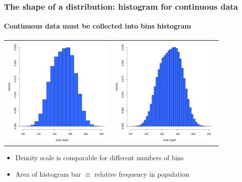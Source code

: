 \documentclass[t]{beamer} %
\begin{document}
\begin{frame}
  \frametitle{The shape of a distribution: histogram for continuous data}
  \framesubtitle{Continuous data must be collected into bins \so histogram}

  \ungap[2.5]
  \begin{center}
    \begin{tabular}{cc}
      \includegraphics[width=55mm]{img/ingary_hist_1} &
      \includegraphics[width=55mm]{img/ingary_hist_2}
    \end{tabular}
  \end{center}

  \ungap[1]
  \begin{itemize}
  \item \h{Density} scale is comparable for different numbers of bins
  \item Area of histogram bar $\equiv$ relative frequency in population
  \end{itemize}
\end{frame}
\end{document}
